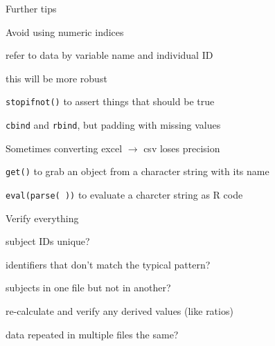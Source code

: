 \documentclass[aspectratio=169,12pt,t]{beamer}
\begin{document}
\begin{frame}{Further tips}

\bbi
\item Avoid using numeric indices
  \bi
\item refer to data by variable name and individual ID
\item this will be more {\hilit robust}
  \ei
\item {\tt stopifnot()} to assert things that should be true
\item {\tt cbind} and {\tt rbind}, but padding with missing values
\item Sometimes converting excel $\rightarrow$ csv loses precision
\item {\tt get()} to grab an object from a character string with its
  name
\item {\tt eval(parse( ))} to evaluate a charcter string as R code
  \ei

\end{frame}




\begin{frame}{Verify everything}

\bbi
\item subject IDs unique?
\item identifiers that don't match the typical pattern?
\item subjects in one file but not in another?
\item re-calculate and verify any derived values (like ratios)
\item data repeated in multiple files the same?
\ei

  \note{
  }
\end{frame}
\end{document}
